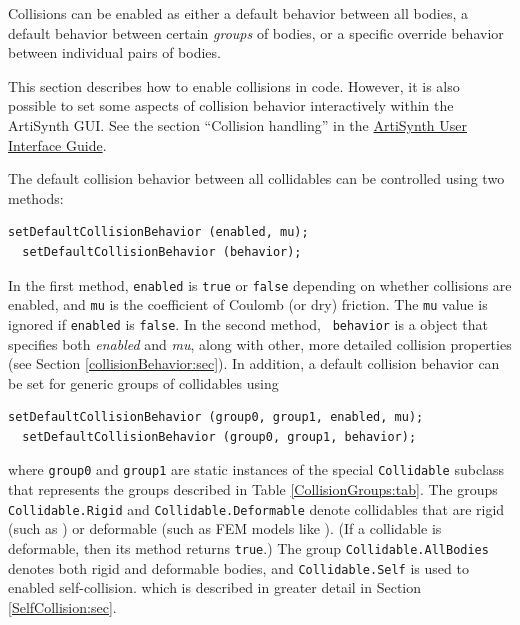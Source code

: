 Collisions can be enabled as either a default behavior between all
bodies, a default behavior between certain {\it groups} of bodies, or
a specific override behavior between individual pairs of bodies.

\begin{sideblock}
This section describes how to enable collisions in code. However,
it is also possible to set some aspects of collision behavior interactively
within the ArtiSynth GUI. See the section ``Collision handling'' in the
\href{\artisynthDocBase/html/uiguide/uiguide.html}{
ArtiSynth User Interface Guide}.
\end{sideblock}

The default collision behavior between all collidables can be
controlled using two methods:
%
\begin{lstlisting}[]
  setDefaultCollisionBehavior (enabled, mu);
  setDefaultCollisionBehavior (behavior);
\end{lstlisting}
%
In the first method, {\tt enabled} is {\tt true} or {\tt false}
depending on whether collisions are enabled, and {\tt mu} is the
coefficient of Coulomb (or dry) friction. The {\tt mu} value is
ignored if {\tt enabled} is {\tt false}. In the second method, {\tt
behavior} is a
 object that
specifies both {\it enabled} and {\it mu}, along with other, more
detailed collision properties (see Section
\ref{collisionBehavior:sec}).  In addition, a default collision
behavior can be set for generic groups of collidables using
%
\begin{lstlisting}[]
  setDefaultCollisionBehavior (group0, group1, enabled, mu);
  setDefaultCollisionBehavior (group0, group1, behavior);
\end{lstlisting}
%
where {\tt group0} and {\tt group1} are static instances of the
special {\tt Collidable} subclass
 that
represents the groups described in Table \ref{CollisionGroups:tab}.
The groups {\tt Collidable.Rigid} and {\tt Collidable.Deformable}
denote collidables that are rigid (such as
) or deformable (such
as FEM models like ).
(If a collidable is deformable, then its
method returns {\tt true}.)  The group {\tt Collidable.AllBodies}
denotes both rigid and deformable bodies, and {\tt Collidable.Self} is
used to enabled self-collision. which is described in greater detail
in Section \ref{SelfCollision:sec}.


